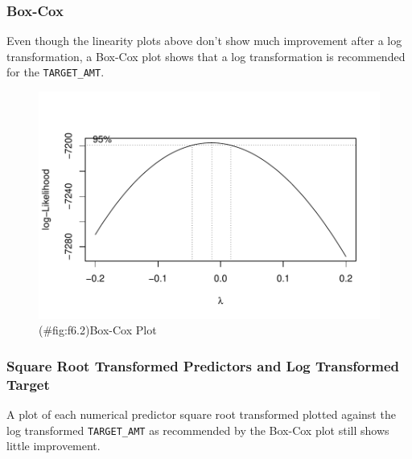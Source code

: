 \documentclass[]{article}
\begin{document}
\subsubsection{Box-Cox}\label{box-cox}

Even though the linearity plots above don't show much improvement after
a log transformation, a Box-Cox plot shows that a log transformation is
recommended for the \texttt{TARGET\_AMT}.

\begin{figure}
\centering
\includegraphics{proj4_files/figure-latex/f6.2-1.pdf}
\caption{(\#fig:f6.2)Box-Cox Plot}
\end{figure}

\subsubsection{Square Root Transformed Predictors and Log Transformed
Target}\label{square-root-transformed-predictors-and-log-transformed-target}

A plot of each numerical predictor square root transformed plotted
against the log transformed \texttt{TARGET\_AMT} as recommended by the
Box-Cox plot still shows little improvement.
\end{document}
